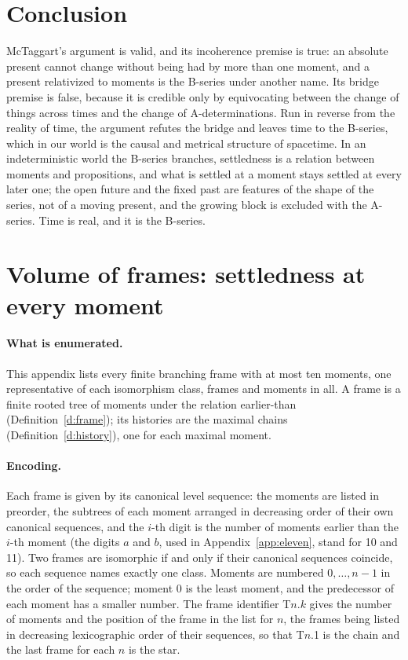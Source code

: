 \documentclass{situationist-preprint}
\begin{document}
\section{Conclusion}\label{s:conclusion}

McTaggart's argument is valid, and its incoherence premise is true: an absolute present cannot change without being had by more than one moment, and a present relativized to moments is the B-series under another name. Its bridge premise is false, because it is credible only by equivocating between the change of things across times and the change of A-determinations. Run in reverse from the reality of time, the argument refutes the bridge and leaves time to the B-series, which in our world is the causal and metrical structure of spacetime. In an indeterministic world the B-series branches, settledness is a relation between moments and propositions, and what is settled at a moment stays settled at every later one; the open future and the fixed past are features of the shape of the series, not of a moving present, and the growing block is excluded with the A-series. Time is real, and it is the B-series.

\clearpage
\appendix

\section{Volume of frames: settledness at every moment}\label{app:detail}

\paragraph{What is enumerated.} This appendix lists every finite branching frame with at most ten moments, one representative of each isomorphism class, \NFramesDetail{} frames and \NMoments{} moments in all. A frame is a finite rooted tree of moments under the relation earlier-than (Definition~\ref{d:frame}); its histories are the maximal chains (Definition~\ref{d:history}), one for each maximal moment.

\paragraph{Encoding.} Each frame is given by its canonical level sequence: the moments are listed in preorder, the subtrees of each moment arranged in decreasing order of their own canonical sequences, and the $i$-th digit is the number of moments earlier than the $i$-th moment (the digits $a$ and $b$, used in Appendix~\ref{app:eleven}, stand for 10 and 11). Two frames are isomorphic if and only if their canonical sequences coincide, so each sequence names exactly one class. Moments are numbered $0, \dots, n-1$ in the order of the sequence; moment 0 is the least moment, and the predecessor of each moment has a smaller number. The frame identifier T$n$.$k$ gives the number of moments and the position of the frame in the list for $n$, the frames being listed in decreasing lexicographic order of their sequences, so that T$n$.1 is the chain and the last frame for each $n$ is the star.
\end{document}

